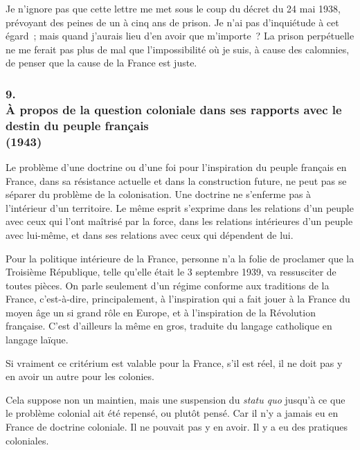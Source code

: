 \documentclass[french,twoside]{book} %
\begin{document}
Je n'ignore pas que cette lettre me met sous le coup du décret du 24 mai 1938, prévoyant des peines de un à cinq ans de prison. Je n'ai pas d'inquiétude à cet égard ; mais quand j'aurais lieu d'en avoir que m'importe ? La prison perpétuelle ne me ferait pas plus de mal que l'impossibilité où je suis, à cause des calomnies, de penser que la cause de la France est juste.\par

\begin{center}
\end{center}
\subsubsection[9. À propos de la question coloniale dans ses rapports avec le destin du peuple français  (1943)]{9. \\
À propos de la question coloniale dans ses rapports avec le destin du peuple français \protect\footnotemark  \\
(1943)}
\noindent \par
Le problème d'une doctrine ou d'une foi pour l'inspiration du peuple français en France, dans sa résistance actuelle et dans la construction future, ne peut pas se séparer du problème de la colonisation. Une doctrine ne s'enferme pas à l'intérieur d'un territoire. Le même esprit s'exprime dans les relations d'un peuple avec ceux qui l'ont maîtrisé par la force, dans les relations intérieures d'un peuple avec lui-même, et dans ses relations avec ceux qui dépendent de lui.\par
Pour la politique intérieure de la France, personne n'a la folie de proclamer que la Troisième République, telle qu'elle était le 3 septembre 1939, va ressusciter de toutes pièces. On parle seulement d'un régime conforme aux traditions de la France, c'est-à-dire, principalement, à l'inspiration qui a fait jouer à la France du moyen âge un si grand rôle en Europe, et à l'inspiration de la Révolution française. C'est d'ailleurs la même en gros, traduite du langage catholique en langage laïque.\par
Si vraiment ce critérium est valable pour la France, s'il est réel, il ne doit pas y en avoir un autre pour les colonies.\par
Cela suppose non un maintien, mais une suspension du {\itshape statu quo} jusqu'à ce que le problème colonial ait été repensé, ou plutôt pensé. Car il n'y a jamais eu en France de doctrine coloniale. Il ne pouvait pas y en avoir. Il y a eu des pratiques coloniales.\par
\end{document}
